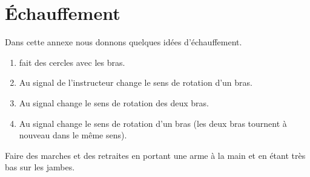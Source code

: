 \chapter{Échauffement}


Dans cette annexe nous donnons quelques idées d'échauffement.


\begin{exercice}


\begin{enumerate}
	\item \A fait des cercles avec les bras.
	
	\item Au signal de l'instructeur \A change le sens de rotation d'un bras.
	
	\item Au signal \A change le sens de rotation des deux bras.
	
	\item Au signal \A change le sens de rotation d'un bras (les deux bras tournent à nouveau dans le même sens).
\end{enumerate}
\end{exercice}


\begin{exercice}

Faire des marches et des retraites en portant une arme à la main et en étant très bas sur les jambes.
\end{exercice}
